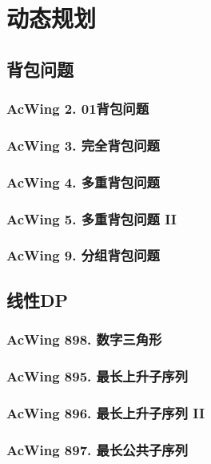 \chapter{动态规划}


\section{背包问题}

\subsection{AcWing 2. 01背包问题}

\subsection{AcWing 3. 完全背包问题}

\subsection{AcWing 4. 多重背包问题}

\subsection{AcWing 5. 多重背包问题 II}

\subsection{AcWing 9. 分组背包问题}


\section{线性DP}

\subsection{AcWing 898. 数字三角形}

\subsection{AcWing 895. 最长上升子序列}

\subsection{AcWing 896. 最长上升子序列 II}

\subsection{AcWing 897. 最长公共子序列}

